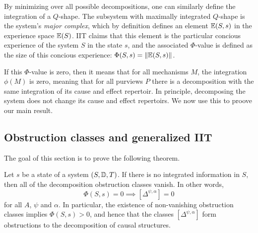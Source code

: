By minimizing over all possible decompositions, one can similarly define the integration of a $Q$-shape. The subsystem with maximally integrated $Q$-shape is the system's \emph{major complex}, which by definition defines an element $\mathbb{E}(S,s)$ in the experience space $\mathbb{E}(S)$. IIT claims that this element is the particular concious experience of the system $S$ in the state $s$, and the associated $\Phi$-value is defined as the size of this concious experience: $\Phi(S,s) = \Vert \mathbb{E}(S,s)\Vert$. 

If this $\Phi$-value is zero, then it means that for all mechanisms $M$, the integration $\phi(M)$ is zero, meaning that for all purviews $P$ there is a decomposition with the same integration of its cause and effect repertoir. In principle, decomposing the system does not change its cause and effect repertoirs. We now use this to proove our main result. 














\subsection{Obstruction classes and generalized IIT}
\label{ssec:obstruction-and-IIT}

The goal of this section is to prove the following theorem.

\begin{theorem}
    \label{thm:obstructions-and-IIT}
    Let $s$ be a state of a system $(S, \mathbb{D}, T)$. If there is no integrated information in $S$, then all of the decomposition obstruction classes vanish. In other words, 
    \[\Phi(S,s)=0 \implies [\Delta^{\psi, \alpha}] = 0\] 
    for all $A$, $\psi$ and $\alpha$. In particular, the existence of non-vanishing obstruction classes implies $\Phi(S,s)>0$, and hence that the classes $[\Delta^{\psi, \alpha}]$ form obstructions to the decomposition of causal structures. 
\end{theorem}



